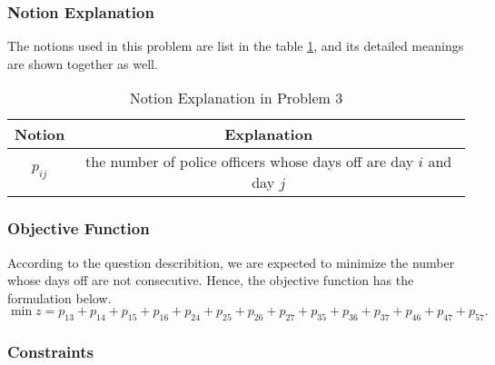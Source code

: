 \documentclass[12pt]{article}
\begin{document}
	\subsubsection{Notion Explanation}
	The notions used in this problem are list in the table \ref{tab10}, and its detailed meanings are shown together as well.
	\begin{table}[H]
		\centering
		\setlength{\belowcaptionskip}{0.1cm}
		\caption{Notion Explanation in Problem 3}
		\label{tab10}
		\begin{tabular}{cc}
			\hline
			\hline
			Notion&Explanation\\
			\hline
			$p_{ij}$ &the number of police officers whose days off are day $i$ and day $j$\\
			\hline
			\hline
		\end{tabular}
	\end{table}
	\subsubsection{Objective Function}
	According to the question describition, we are expected to minimize the number whose days off are not consecutive. Hence, the objective function has the formulation below.
	\begin{equation}
		\min z = p_{13}+p_{14}+p_{15}+p_{16}+p_{24}+p_{25}+p_{26}+p_{27}+p_{35}+p_{36}+p_{37}+p_{46}+p_{47}+p_{57}.
	\end{equation}
	\subsubsection{Constraints}
\end{document}
